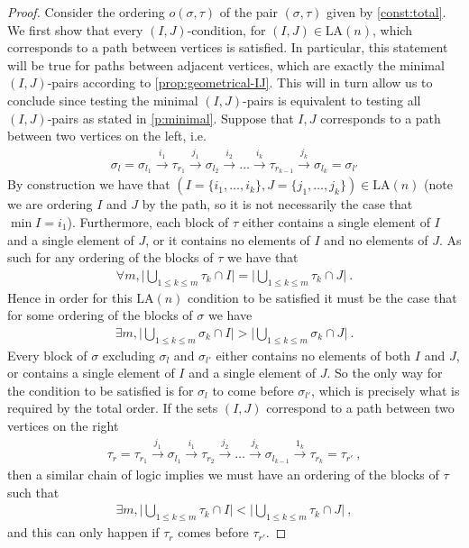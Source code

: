 \documentclass{amsart}
\theoremstyle{definition}
\newcommand{\LA}{\mathrm{LA}}
\begin{document}
\begin{proof}
Consider the ordering $o(\sigma,\tau)$ of the pair $(\sigma,\tau)$ given by \cref{const:total}. 
We first show that every $(I,J)$-condition, for $(I,J) \in \LA(n)$, which corresponds to a path between vertices is satisfied. 
In particular, this statement will be true for paths between adjacent vertices, which are exactly the minimal $(I,J)$-pairs according to \cref{prop:geometrical-IJ}.
This will in turn allow us to conclude since testing the minimal $(I,J)$-pairs is equivalent to testing all $(I,J)$-pairs as stated in \cref{p:minimal}. 
Suppose that $I,J$ corresponds to a path between two vertices on the left, i.e.
\begin{align*}
    \sigma_l = \sigma_{l_1} \xrightarrow{i_1} \tau_{r_1}\xrightarrow{j_1} \sigma_{l_2} \xrightarrow{i_2}\dots \xrightarrow{i_{k}} \tau_{r_{k-1}} \xrightarrow{j_k} \sigma_{l_k}= \sigma_{l'}
\end{align*}
By construction we have that $(I = \{i_1,\dots,i_k\},J=\{j_1,\dots,j_k\}) \in \LA(n)$ (note we are ordering $I$ and $J$ by the path, so it is not necessarily the case that $\min I = i_1$). 
Furthermore, each block of $\tau$ either contains a single element of $I$ and a single element of $J$, or it contains no elements of $I$ and no elements of $J$. 
As such for any ordering of the blocks of $\tau$ we have that
\begin{align*}
    \forall m, \bigg|\bigcup_{1\leq k \leq m} \tau_{k} \cap I \bigg| = \bigg|\bigcup_{1\leq k \leq m} \tau_{k} \cap J \bigg| \ .
\end{align*}
Hence in order for this $\LA(n)$ condition to be satisfied it must be the case that for some ordering of the blocks of $\sigma$ we have
\begin{align*}
    \exists m, \bigg| \bigcup_{1\leq k \leq m} \sigma_k \cap I \bigg| > \bigg|\bigcup_{1\leq k \leq m} \sigma_k \cap J \bigg| \ .
\end{align*}
Every block of $\sigma$ excluding $\sigma_l$ and $\sigma_{l'}$ either contains no elements of both $I$ and $J$, or contains a single element of $I$ and a single element of $J$. 
So the only way for the condition to be satisfied is for $\sigma_l$ to come before $\sigma_{l'}$, which is precisely what is required by the total order.
If the sets $(I,J)$ correspond to a path between two vertices on the right
\begin{align*}
    \tau_r = \tau_{r_1} \xrightarrow{j_1} \sigma_{l_1}\xrightarrow{i_1} \tau_{r_2} \xrightarrow{j_2}\dots \xrightarrow{j_{k}} \sigma_{l_{k-1}} \xrightarrow{1_k} \tau_{r_k}=\tau_{r'} \ ,
\end{align*}
then a similar chain of logic implies we must have an ordering of the blocks of $\tau$ such that
\begin{align*}
    \exists m, \bigg|\bigcup_{1\leq k \leq m}\tau_k \cap I\bigg| < \bigg|\bigcup_{1\leq k \leq m} \tau_k \cap J\bigg| \ , 
\end{align*}
and this can only happen if $\tau_r$ comes before $\tau_{r'}$.
\end{proof}
\end{document}
